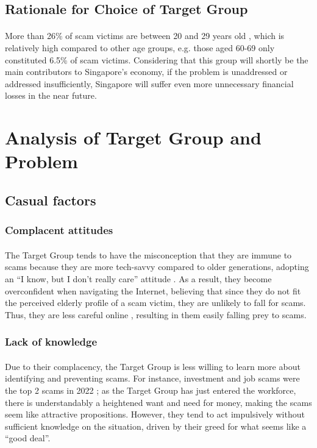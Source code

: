 \documentclass[a4paper]{article}
\begin{document}
\begin{multicols}{2}
    \subsection{Rationale for Choice of Target Group}
    \paragraph{} More than 26\% of scam victims are between 20 and 29
    years old \parencite{Chua.2023}, which is relatively high compared
    to other age groups, e.g. those aged 60-69 only constituted 6.5\%
    of scam victims. Considering that this group will shortly be
    the main contributors to Singapore’s economy, if the problem is
    unaddressed or addressed insufficiently, Singapore will suffer even
    more unnecessary financial losses in the near future.

    \section{Analysis of Target Group and Problem}
    \subsection{Casual factors}
    \subsubsection{Complacent attitudes}
    \paragraph{} The Target Group tends to have the misconception that
    they are immune to scams because they are more tech-savvy compared
    to older generations, adopting an “I know, but I don’t really
    care” attitude \parencite{BrandStudio.2020}. As a result, they
    become overconfident when navigating the Internet, believing that
    since they do not fit the perceived elderly profile of a scam victim,
    they are unlikely to fall for scams. Thus, they are less careful
    online \parencite{Carlson.2022}, resulting in them easily falling
    prey to scams.
    \subsubsection{Lack of knowledge}
    \paragraph{} Due to their complacency, the Target Group is less
    willing to learn more about identifying and preventing scams. For
    instance, investment and job scams were the top 2 scams in 2022
    \parencite{Chua.2023}; as the Target Group has just entered the
    workforce, there is understandably a heightened want and need for
    money, making the scams seem like attractive propositions. However,
    they tend to act impulsively without sufficient knowledge on the
    situation, driven by their greed for what seems like a ``good deal''.


\end{multicols}
\end{document}
